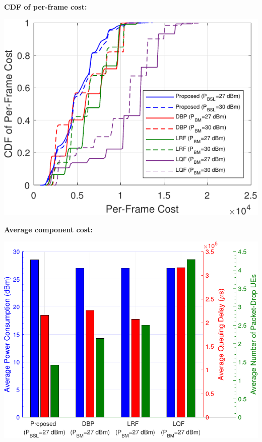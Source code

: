 \documentclass[paperwidth=46.8in,paperheight=26.3in,fontscale=0.35]{baposter}
\begin{document}
\begin{poster}
{\begin{minipage}[t]{0.48\linewidth}
        \end{minipage}
        \hfill
        \begin{minipage}[t]{0.21\linewidth}
            \vspace{0.0em}
            \textbf{\color{icc}CDF of per-frame cost:}
            \begin{center}
                \vspace{-0.8em}
                \includegraphics[width=\textwidth]{fig/scenario3_CDF.pdf}
            \end{center}
            \vspace{-1em}
            \textbf{\color{icc}Average component cost:}
            \begin{center}
                \vspace{-0.8em}
                \includegraphics[width=\textwidth]{fig/scenario3_bar27.pdf}
            \end{center}
        \end{minipage}
    }

\end{poster}
\end{document}
